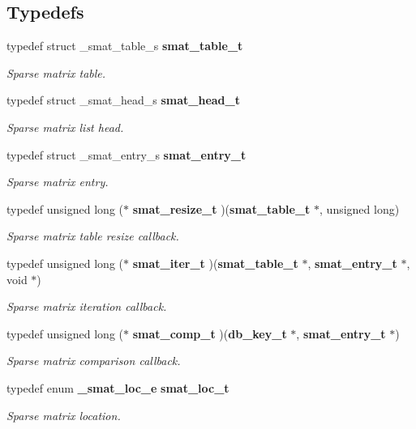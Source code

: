 \subsection*{Typedefs}
\begin{CompactItemize}
\item 
typedef struct \_\-smat\_\-table\_\-s {\bf smat\_\-table\_\-t}
\begin{CompactList}\small\item\em Sparse matrix table.\item\end{CompactList}\item 
typedef struct \_\-smat\_\-head\_\-s {\bf smat\_\-head\_\-t}
\begin{CompactList}\small\item\em Sparse matrix list head.\item\end{CompactList}\item 
typedef struct \_\-smat\_\-entry\_\-s {\bf smat\_\-entry\_\-t}
\begin{CompactList}\small\item\em Sparse matrix entry.\item\end{CompactList}\item 
typedef unsigned long ($\ast$ {\bf smat\_\-resize\_\-t} )({\bf smat\_\-table\_\-t} $\ast$, unsigned long)
\begin{CompactList}\small\item\em Sparse matrix table resize callback.\item\end{CompactList}\item 
typedef unsigned long ($\ast$ {\bf smat\_\-iter\_\-t} )({\bf smat\_\-table\_\-t} $\ast$, {\bf smat\_\-entry\_\-t} $\ast$, void $\ast$)
\begin{CompactList}\small\item\em Sparse matrix iteration callback.\item\end{CompactList}\item 
typedef unsigned long ($\ast$ {\bf smat\_\-comp\_\-t} )({\bf db\_\-key\_\-t} $\ast$, {\bf smat\_\-entry\_\-t} $\ast$)
\begin{CompactList}\small\item\em Sparse matrix comparison callback.\item\end{CompactList}\item 
typedef enum {\bf \_\-smat\_\-loc\_\-e} {\bf smat\_\-loc\_\-t}
\begin{CompactList}\small\item\em Sparse matrix location.\item\end{CompactList}\end{CompactItemize}
